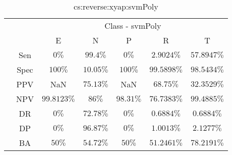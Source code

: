 \begin{table}[!ht]
	\centering
	\begin{tabular}{|c|c|c|c|c|c|c|}
		\cline{3-7}
		\multicolumn{2}{c|}{} & \multicolumn{5}{c|}{Class - svmPoly} \\ \cline{3-7}
		\multicolumn{2}{c|}{} & E & N & P & R & T \\ \hline
		\multirow{7}{*}{\rotatebox{90}{Statistics}} & Sen & $0\%$ & $99.4\%$ & $0\%$ & $2.9024\%$ & $57.8947\%$ \\ \cline{2-7}
		 & Spec & $100\%$ & $10.05\%$ & $100\%$ & $99.5898\%$ & $98.5434\%$ \\ \cline{2-7}
		 & PPV & NaN & $75.13\%$ & NaN & $68.75\%$ & $32.3529\%$ \\ \cline{2-7}
		 & NPV & $99.8123\%$ & $86\%$ & $98.31\%$ & $76.7383\%$ & $99.4885\%$ \\ \cline{2-7}
		 & DR & $0\%$ & $72.78\%$ & $0\%$ & $0.6884\%$ & $0.6884\%$ \\ \cline{2-7}
		 & DP & $0\%$ & $96.87\%$ & $0\%$ & $1.0013\%$ & $2.1277\%$ \\ \cline{2-7}
		 & BA & $50\%$ & $54.72\%$ & $50\%$ & $51.2461\%$ & $78.2191\%$ \\ \hline
	\end{tabular}
	\caption{cs:reverse:xyap:svmPoly}
	\label{tab:cs:reverse:xyap:svmPoly}
\end{table}
